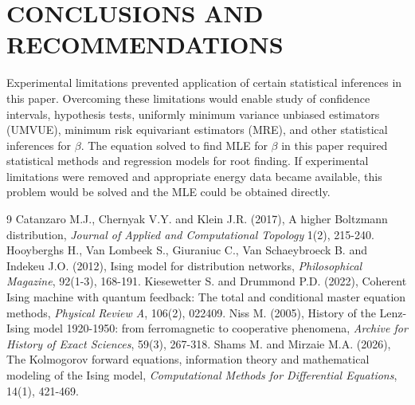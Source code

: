 \documentclass[twoside]{article}
\begin{document}
\section{CONCLUSIONS AND RECOMMENDATIONS} \label{sec6}
 Experimental limitations prevented application of certain statistical inferences in this paper. Overcoming these limitations would enable study of confidence intervals, hypothesis tests, uniformly minimum variance unbiased estimators (UMVUE), minimum risk equivariant estimators (MRE), and other statistical inferences for $\beta$. The equation solved to find MLE for $\beta$ in this paper required statistical methods and regression models for root finding. If experimental limitations were removed and appropriate energy data became available, this problem would be solved and the MLE could be obtained directly.

\begin{thebibliography}{9}
Catanzaro M.J., Chernyak V.Y. and Klein J.R. (2017), A higher Boltzmann distribution, {\it Journal of Applied and Computational Topology} 1(2), 215-240.
Hooyberghs H., Van Lombeek S., Giuraniuc C., Van Schaeybroeck B. and Indekeu J.O. (2012), Ising model for distribution networks, {\it Philosophical Magazine}, 92(1-3), 168-191.
Kiesewetter S. and Drummond P.D. (2022), Coherent Ising machine with quantum feedback: The total and conditional master equation methods, {\it Physical Review A}, 106(2), 022409.
Niss M. (2005), History of the Lenz-Ising model 1920-1950: from ferromagnetic to cooperative phenomena, {\it Archive for History of Exact Sciences}, 59(3), 267-318.
Shams M. and Mirzaie M.A. (2026), The Kolmogorov forward equations, information theory and mathematical modeling of the Ising model, {\it Computational Methods for Differential Equations}, 14(1), 421-469.
\end{thebibliography}
\end{document}
